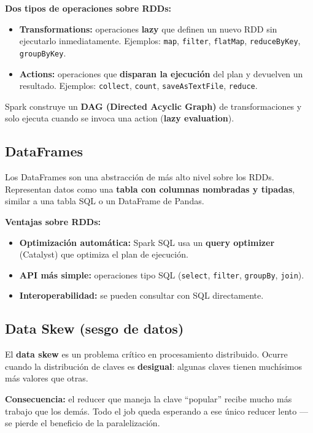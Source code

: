 \documentclass[11pt, a4paper]{article}
\begin{document}
\textbf{Dos tipos de operaciones sobre RDDs:}
\begin{itemize}
	\item \textbf{Transformations:} operaciones \textbf{lazy} que definen un nuevo RDD sin ejecutarlo inmediatamente. Ejemplos: \texttt{map}, \texttt{filter}, \texttt{flatMap}, \texttt{reduceByKey}, \texttt{groupByKey}.
	\item \textbf{Actions:} operaciones que \textbf{disparan la ejecución} del plan y devuelven un resultado. Ejemplos: \texttt{collect}, \texttt{count}, \texttt{saveAsTextFile}, \texttt{reduce}.
\end{itemize}

Spark construye un \textbf{DAG (Directed Acyclic Graph)} de transformaciones y solo ejecuta cuando se invoca una action (\textbf{lazy evaluation}).

\subsection{DataFrames}

Los DataFrames son una abstracción de más alto nivel sobre los RDDs. Representan datos como una \textbf{tabla con columnas nombradas y tipadas}, similar a una tabla SQL o un DataFrame de Pandas.

\textbf{Ventajas sobre RDDs:}
\begin{itemize}
	\item \textbf{Optimización automática:} Spark SQL usa un \textbf{query optimizer} (Catalyst) que optimiza el plan de ejecución.
	\item \textbf{API más simple:} operaciones tipo SQL (\texttt{select}, \texttt{filter}, \texttt{groupBy}, \texttt{join}).
	\item \textbf{Interoperabilidad:} se pueden consultar con SQL directamente.
\end{itemize}

\subsection{Data Skew (sesgo de datos)}

El \textbf{data skew} es un problema crítico en procesamiento distribuido. Ocurre cuando la distribución de claves es \textbf{desigual}: algunas claves tienen muchísimos más valores que otras.

\textbf{Consecuencia:} el reducer que maneja la clave ``popular'' recibe mucho más trabajo que los demás. Todo el job queda esperando a ese único reducer lento --- se pierde el beneficio de la paralelización.
\end{document}
